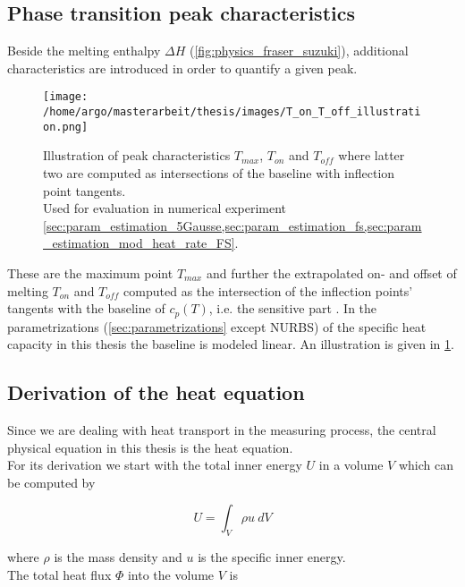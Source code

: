 \documentclass{scrartcl}[12pt, halfparskip]
\numberwithin{equation}{section}
\numberwithin{figure}{section}
\numberwithin{table}{section}
\begin{document}
\subsection{Phase transition peak characteristics}
\label{sec:peak_characteristics}
Beside the melting enthalpy $\Delta H$ (\cref{fig:physics_fraser_suzuki}), additional characteristics are introduced in order to quantify a given peak.


\begin{figure}[H]
	\centering
	\texttt{[image: /home/argo/masterarbeit/thesis/images/T\_on\_T\_off\_illustration.png]}
	\caption{Illustration of peak characteristics $T_{max}$, $T_{on}$ and $T_{off}$ where latter two are computed as intersections of the baseline with inflection point tangents. \\
	Used for evaluation in numerical experiment \cref{sec:param_estimation_5Gausse,sec:param_estimation_fs,sec:param_estimation_mod_heat_rate_FS}.}
	\label{fig:T_on/off_illustration}
\end{figure}

These are the maximum point $T_{max}$ and further the extrapolated on- and offset of melting $T_{on}$ and $T_{off}$ computed as the intersection of the inflection points' tangents with the baseline of $c_p(T)$, i.e. the sensitive part \cite{DIN_11357}. In the parametrizations (\cref{sec:parametrizations} except NURBS) of the specific heat capacity in this thesis the baseline is modeled linear. An illustration is given in \cref{fig:T_on/off_illustration}.


\subsection{Derivation of the heat equation}
\label{sec:heat_equation}

Since we are dealing with heat transport in the measuring process, the central physical equation in this thesis is the heat equation. \\
For its derivation \cite{lit:waerme_und_stoffuebertragung}
we start with the total inner energy $U$ in a volume $V$ which can be computed by

\begin{equation}
	U = \int_{V} \rho u \ dV
\end{equation}

where $\rho$ is the mass density and $u$ is the specific inner energy. \\
The total heat flux $\varPhi$ into the volume $V$ is
\end{document}
